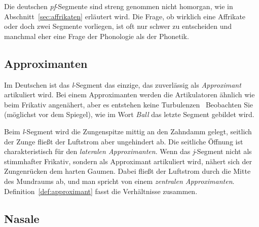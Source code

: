 Die deutschen \textit{pf}-Segmente sind \zB streng genommen nicht homorgan, wie in Abschnitt~\ref{sec:affrikaten} erläutert wird.
Die Frage, ob wirklich eine Affrikate oder doch zwei Segmente vorliegen, ist oft nur schwer zu entscheiden und manchmal eher eine Frage der Phonologie als der Phonetik.

\Np

\subsection{Approximanten}
\label{sec:approximanten}

Im Deutschen ist das \textit{l}-Segment das einzige, das zuverlässig als \textit{Approximant} artikuliert wird.
Bei einem Approximanten werden die Artikulatoren ähnlich wie beim Frikativ angenähert, aber es entstehen keine Turbulenzen
\TuBegin~Beobachten Sie (möglichst vor dem Spiegel), wie im Wort \textit{Ball} das letzte Segment gebildet wird.

Beim \textit{l}-Segment wird die Zungenspitze mittig an den Zahndamm gelegt, seitlich der Zunge fließt der Luftstrom aber ungehindert ab.
Die seitliche Öffnung ist charakteristisch für den \textit{lateralen Approximanten}.
Wenn das \textit{j}-Segment nicht als stimmhafter Frikativ, sondern als Approximant artikuliert wird, nähert sich der Zungenrücken dem harten Gaumen.
Dabei fließt der Luftstrom durch die Mitte des Mundraums ab, und man spricht von einem \textit{zentralen Approximanten}.
Definition~\ref{def:approximant} fasst die Verhältnisse zusammen.

\Stretch


\Stretch

\subsection{Nasale}
\label{sec:nasale}

